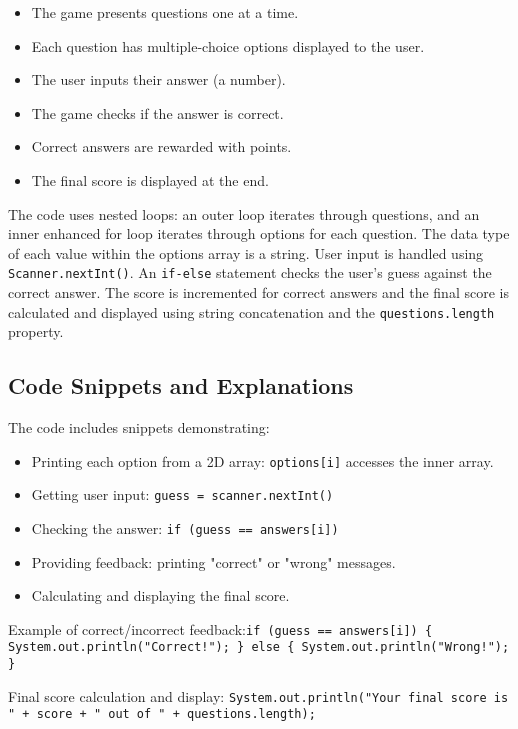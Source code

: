 \documentclass{article}
\begin{document}
\begin{itemize}
    \item The game presents questions one at a time.
    \item  Each question has multiple-choice options displayed to the user.
    \item The user inputs their answer (a number).
    \item The game checks if the answer is correct.
    \item Correct answers are rewarded with points.
    \item The final score is displayed at the end.
\end{itemize}

The code uses nested loops: an outer loop iterates through questions, and an inner enhanced for loop iterates through options for each question.  The data type of each value within the options array is a string.  User input is handled using \texttt{Scanner.nextInt()}.  An \texttt{if-else} statement checks the user's guess against the correct answer.  The score is incremented for correct answers and the final score is calculated and displayed using string concatenation and the \texttt{questions.length} property.


\subsection{Code Snippets and Explanations}

The code includes snippets demonstrating:

\begin{itemize}
    \item  Printing each option from a 2D array:  \texttt{options[i]} accesses the inner array.
    \item Getting user input: \texttt{guess = scanner.nextInt()}
    \item Checking the answer: \texttt{if (guess == answers[i])}
    \item Providing feedback: printing "correct" or "wrong" messages.
    \item Calculating and displaying the final score.
\end{itemize}

Example of correct/incorrect feedback:\texttt{if (guess == answers[i]) \{ System.out.println("Correct!"); \} else \{ System.out.println("Wrong!"); \}}

Final score calculation and display: \texttt{System.out.println("Your final score is " + score + " out of " + questions.length);}
\end{document}
